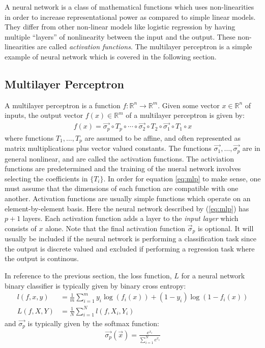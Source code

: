 A neural network is a class of mathematical functions which uses non-linearities in order to increase representational power as compared to simple linear models. \cite{bishop}  They differ from other non-linear models like logistic regression by having multiple ``layers'' of nonlinearity between the input and the output.  These non-linearities are called \textit{activation functions}.  The multilayer perceptron is a simple example of neural network which is covered in the following section.

\subsection{Multilayer Perceptron}
A multilayer perceptron is a function $f:\mathbb{R}^n\rightarrow \mathbb{R}^m$. Given some vector $x\in \mathbb{R}^n$ of inputs, the output vector $f(x)\in\mathbb{R}^m$ of a multilayer perceptron is given by:
\begin{align}\label{eq:mlp}
    f(x) = \vec{\sigma_p} \circ T_p \circ\cdots\circ \vec{\sigma_2}\circ T_2\circ \vec{\sigma_1} \circ T_1\circ x
\end{align}
where functions $T_1,\dots,T_p$ are assumed to be affine, and often represented as matrix multiplications plus vector valued constants.  The functions $\vec{\sigma_1},\dots,\vec{\sigma_p}$ are in general nonlinear, and are called the activation functions.  The activiation functions are predetermined and the training of the nueral network involves selecting the coefficients in $\{T_i\}$.  In order for equation \ref{eq:mlp} to make sense, one must assume that the dimensions of each function are compatible with one another.  Activation functions are usually simple functions which operate on an element-by-element basis.  Here the neural network described by (\ref{eq:mlp}) has $p+1$ layers.  Each activation function adds a layer to the \textit{input layer} which consists of $x$ alone.  Note that the final activation function $\vec{\sigma}_p$ is optional.  It will usually be included if the neural network is performing a classification task since the output is discrete valued and excluded if performing a regression task where the output is continous.

In reference to the previous section, the loss function, $L$ for a neural network binary classifier is typically given by binary cross entropy:
\begin{align}
    l(f,x,y) &= \frac{1}{m}\sum_{i=1}^m y_i\log(f_i(x)) + (1-y_i)\log(1-f_i(x))\\
    L(f,X,Y) &= \frac{1}{N}\sum_{i=1}^N l(f,X_i,Y_i)
\end{align}
 and $\vec{\sigma_p}$ is typically given by the softmax function:
\begin{align}
    \vec{\sigma_p}(\vec{x}) = \frac{e^{x_i}}{\sum_{i=1}^N e^{x_i}}
\end{align}
